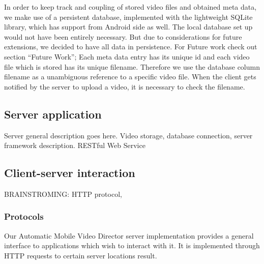 \documentclass[conference]{IEEEtran}
\begin{document}
In order to keep track and coupling of stored video files and obtained meta data, we make use of a persistent database, implemented with the lightweight SQLite library, which has support from Android side as well. The local database set up would not have been entirely necessary. But due to considerations for future extensions, we decided to have all data in persistence. For Future work check out section ``Future Work'';
Each meta data entry has its unique id and each video file which is stored has its unique filename. Therefore we use the database column filename as a unambiguous reference to a specific video file. When the client gets notified by the server to upload a video, it is necessary to check the filename.







\subsection{Server application}
Server general description goes here.
Video storage, database connection, server framework description. RESTful Web Service

\subsection{Client-server interaction}
BRAINSTROMING: HTTP protocol, 

\subsubsection{Protocols}
Our Automatic Mobile Video Director server implementation provides 
a general interface to applications which wish to interact with it. 
It is implemented through HTTP requests to certain server locations result.
\end{document}

